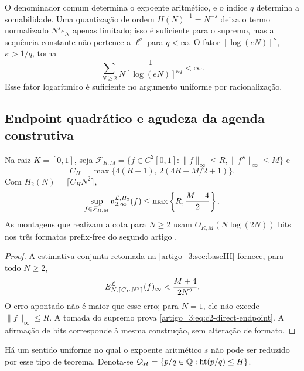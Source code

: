 \begin{remark}\label{map:artigo_3:4.4}
\label{artigo_3:rem:q-height-role}
O denominador comum determina o expoente aritmético, e o índice $q$ determina
a somabilidade. Uma quantização de ordem
$H(N)^{-1}=N^{-s}$ deixa o termo normalizado $N^se_N$ apenas limitado; isso
é suficiente para o supremo, mas a sequência constante não pertence a
$\ell^q$ para $q<\infty$. O fator $[\log(eN)]^\kappa$, $\kappa>1/q$, torna
\[
 \sum_{N\ge2}\frac1{N[\log(eN)]^{\kappa q}}<\infty.
\]
Esse fator logarítmico é suficiente no argumento uniforme por
racionalização.
\end{remark}

\subsection{Endpoint quadrático e agudeza da agenda construtiva}

\begin{corollary}[endpoint $C^2$]\label{map:artigo_3:4.5}
\label{artigo_3:cor:c2-direct-endpoint}
Na raiz $K=[0,1]$, seja
$\mathcal F_{R,M}=\{f\in C^2[0,1]:\|f\|_\infty\le R,
\|f''\|_\infty\le M\}$ e
\[
 C_H=\max\{4(R+1),\,2(4R+M/2+1)\}.
\]
Com $H_2(N)=\lceil C_HN^2\rceil$,
\begin{equation}
 \sup_{f\in\mathcal F_{R,M}}
 \mathfrak a_{2,\infty}^{\mathcal{L},H_2}(f)
 \le\max\left\{R,\frac{M+4}{2}\right\}.
 \label{artigo_3:eq:c2-direct-endpoint}
\end{equation}
As montagens que realizam a cota para $N\ge2$ usam
$O_{R,M}(N\log(2N))$ bits nos três formatos prefix-free do
segundo artigo \citep{artigo_2-oliveiraII}.
\end{corollary}

\begin{proof}
A estimativa conjunta retomada na \cref{artigo_3:sec:baseIII} fornece, para todo $N\ge2$,
\[
 E_{N,\lceil C_HN^2\rceil}^{\mathcal{L}}(f)_\infty
 <\frac{M+4}{2N^2}.
\]
O erro apontado não é maior que esse erro; para $N=1$, ele não excede
$\|f\|_\infty\le R$. A tomada do supremo prova
\eqref{artigo_3:eq:c2-direct-endpoint}. A afirmação de bits corresponde à mesma construção,
sem alteração de formato.
\end{proof}

Há um sentido uniforme no qual o expoente aritmético $s$ não pode ser
reduzido por esse tipo de teorema. Denota-se
$\mathcal Q_H=\{p/q\in\mathbb Q:\operatorname{ht}(p/q)\le H\}$.

